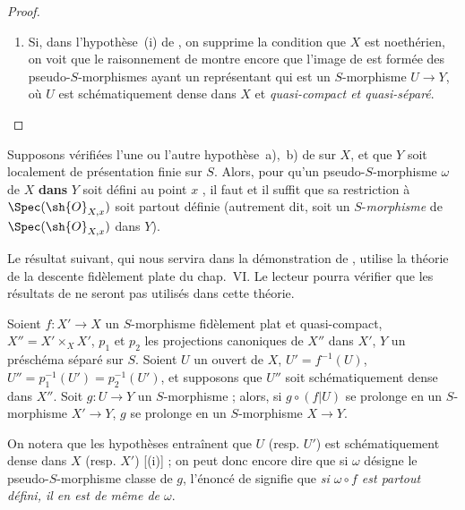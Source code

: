 \begin{proof}
\begin{remarks}[20.3.8.7]
\begin{enumerate}[label=(\roman*)]
  \item Si, dans l'hypothèse~(i) de , on supprime la condition que $X$ est noethérien, on voit que le raisonnement de  montre encore que l'image de  est formée des pseudo-$S$-morphismes ayant un représentant qui est un $S$-morphisme $U\to Y$, où $U$ est schématiquement dense dans $X$ et \emph{quasi-compact et quasi-séparé}.
\end{enumerate}
\end{remarks}
\end{proof}

\begin{corollary}[20.3.9]
\label{IV.20.3.9}
Supposons vérifiées l'une ou l'autre hypothèse~\textup{a)},~\textup{b)} de  sur $X$, et que $Y$ soit localement de présentation finie sur $S$.
Alors, pour qu'un pseudo-$S$-morphisme $\omega$ de $X$ \textbf{dans} $Y$ soit défini au point $x$ , il faut et il suffit que sa restriction à $\Spec(\sh{O}_{X,x})$ soit partout définie \textup{(autrement dit, soit un $S$-\emph{morphisme} de $\Spec(\sh{O}_{X,x})$ dans $Y$)}.
\end{corollary}

Le résultat suivant, qui nous servira dans la démonstration de , utilise la théorie de la descente fidèlement plate du chap.~VI.
Le lecteur pourra vérifier que les résultats de  ne seront pas utilisés dans cette théorie.

\begin{lemma}[20.3.10]
\label{IV.20.3.10}
Soient $f:X'\to X$ un $S$-morphisme fidèlement plat et quasi-compact, $X''=X'\times_X X'$, $p_1$ et $p_2$ les projections canoniques de $X''$ dans $X'$, $Y$ un préschéma séparé sur $S$.
Soient $U$ un ouvert de $X$, $U'=f^{-1}(U)$, $U''=p_1^{-1}(U')=p_2^{-1}(U')$, et supposons que $U''$ soit schématiquement dense dans $X''$.
Soit $g:U\to Y$ un $S$-morphisme ; alors, si $g\circ(f|U)$ se prolonge en un $S$-morphisme $X'\to Y$, $g$ se prolonge en un $S$-morphisme $X\to Y$.
\end{lemma}

On notera que les hypothèses entraînent que $U$ (resp. $U'$) est schématiquement dense dans $X$ (resp. $X'$) [(i)] ; on peut donc encore dire que si $\omega$ désigne le pseudo-$S$-morphisme classe de $g$, l'énoncé de  signifie que \emph{si $\omega\circ f$ est partout défini, il en est de même de $\omega$}.

